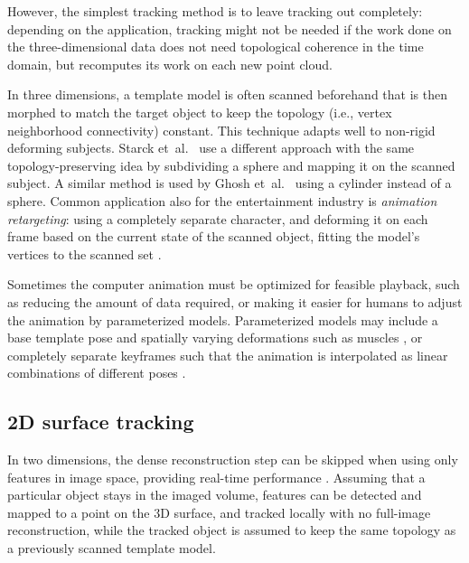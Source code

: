 However, the simplest tracking method is to leave tracking out completely: depending on the application, tracking might not be needed if the work done on the three-dimensional data does not need topological coherence in the time domain, but recomputes its work on each new point cloud.


In three dimensions, a template model is often scanned beforehand that is then morphed to match the target object to keep the topology (i.e., vertex neighborhood connectivity) constant.
This technique adapts well to non-rigid deforming subjects. \cite{bojsen2012tracking,li2009robust}
Starck et~al.\ \cite{starck2007surface} use a different approach with the same topology-preserving idea by subdividing a sphere and mapping it on the scanned subject.
A similar method is used by Ghosh et~al.\ \cite{ghosh2011multiview} using a cylinder instead of a sphere.
Common application also for the entertainment industry is \emph{animation retargeting}: using a completely separate character, and deforming it on each frame based on the current state of the scanned object, fitting the model's vertices to the scanned set \cite{sumner2004deformation}.

Sometimes the computer animation must be optimized for feasible playback, such as reducing the amount of data required, or making it easier for humans to adjust the animation by parameterized models.
Parameterized models may include a base template pose and spatially varying deformations such as muscles \cite{waters1987muscle}, or completely separate keyframes such that the animation is interpolated as linear combinations of different poses \cite{deng2007computer,beeler2011high}.


\subsection{2D surface tracking} %


In two dimensions, the dense reconstruction step can be skipped when using only features in image space, providing real-time performance \cite{pilet2005real}.
Assuming that a particular object stays in the imaged volume, features can be detected and mapped to a point on the 3D surface, and tracked locally with no full-image reconstruction, while the tracked object is assumed to keep the same topology as a previously scanned template model.

